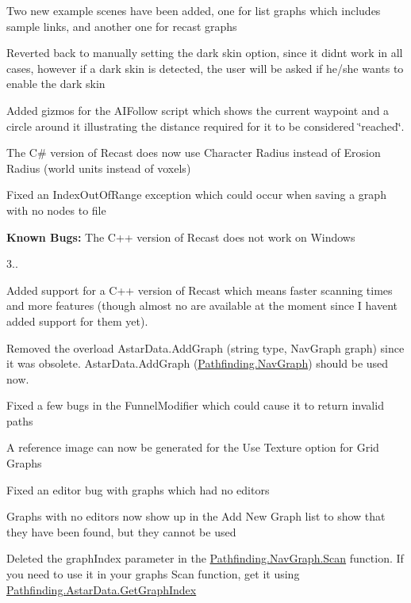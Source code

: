 \begin{DoxyItemize}
\begin{DoxyItemize}
\item Two new example scenes have been added, one for list graphs which includes sample links, and another one for recast graphs
\item Reverted back to manually setting the dark skin option, since it didn\textquotesingle{}t work in all cases, however if a dark skin is detected, the user will be asked if he/she wants to enable the dark skin
\item Added gizmos for the A\+I\+Follow script which shows the current waypoint and a circle around it illustrating the distance required for it to be considered \char`\"{}reached\char`\"{}.
\item The C\# version of Recast does now use Character Radius instead of Erosion Radius (world units instead of voxels)
\item Fixed an Index\+Out\+Of\+Range exception which could occur when saving a graph with no nodes to file
\item {\bfseries{Known Bugs\+:}} The C++ version of Recast does not work on Windows
\end{DoxyItemize}
\item 3..
\begin{DoxyItemize}
\item Added support for a C++ version of Recast which means faster scanning times and more features (though almost no are available at the moment since I haven\textquotesingle{}t added support for them yet).
\item Removed the overload Astar\+Data.\+Add\+Graph (string type, Nav\+Graph graph) since it was obsolete. Astar\+Data.\+Add\+Graph (\mbox{\hyperlink{class_pathfinding_1_1_nav_graph}{Pathfinding.\+Nav\+Graph}}) should be used now.
\item Fixed a few bugs in the Funnel\+Modifier which could cause it to return invalid paths
\item A reference image can now be generated for the Use Texture option for Grid Graphs
\item Fixed an editor bug with graphs which had no editors
\item Graphs with no editors now show up in the Add New Graph list to show that they have been found, but they cannot be used
\item Deleted the graph\+Index parameter in the \mbox{\hyperlink{class_pathfinding_1_1_nav_graph_a39f2705caa347e4614d2b46fd0ac5f27}{Pathfinding.\+Nav\+Graph.\+Scan}} function. If you need to use it in your graph\textquotesingle{}s Scan function, get it using \mbox{\hyperlink{class_pathfinding_1_1_astar_data_a7feed04d37b0456c3f5b9536b39586ba}{Pathfinding.\+Astar\+Data.\+Get\+Graph\+Index}}

\end{DoxyItemize}
\end{DoxyItemize}
